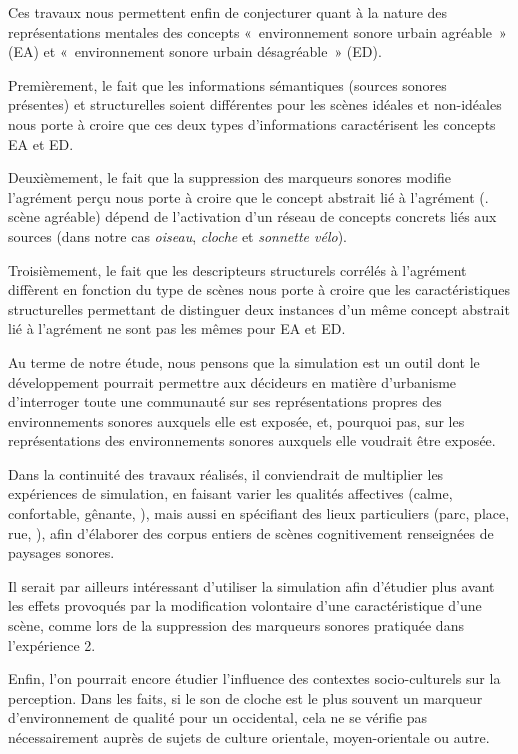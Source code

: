 \documentclass[twoside,twocolumn]{article}
\begin{document}
Ces travaux nous permettent enfin de conjecturer quant à la nature des représentations mentales des concepts «~environnement sonore urbain agréable~» (EA) et «~environnement sonore urbain désagréable~» (ED).

Premièrement, le fait que les informations sémantiques (sources sonores présentes) et structurelles soient différentes pour les scènes idéales et non-idéales nous porte à croire que ces deux types d'informations caractérisent les concepts EA et ED.

Deuxièmement, le fait que la suppression des marqueurs sonores modifie l'agrément perçu nous porte à croire que le concept abstrait lié à l'agrément (\eg. scène agréable) dépend de l'activation d'un réseau de concepts concrets liés aux sources (dans notre cas \emph{oiseau}, \emph{cloche} et \emph{sonnette vélo}).

Troisièmement, le fait que les descripteurs structurels corrélés à l'agrément diffèrent en fonction du type de scènes nous porte à croire que les caractéristiques structurelles permettant de distinguer deux instances d'un même concept abstrait lié à l'agrément ne sont pas les mêmes pour EA et ED.

Au terme de notre étude, nous pensons que la simulation est un outil dont le développement pourrait permettre aux décideurs en matière d'urbanisme d'interroger toute une communauté sur ses représentations propres des environnements sonores auxquels elle est exposée, et, pourquoi pas, sur les représentations des environnements sonores auxquels elle voudrait être exposée.

Dans la continuité des travaux réalisés, il conviendrait de multiplier les expériences de simulation, en faisant varier les qualités affectives (calme, confortable, gênante, \etc), mais aussi en spécifiant des lieux particuliers (parc, place, rue, \etc), afin d'élaborer des corpus entiers de scènes cognitivement renseignées de paysages sonores.

Il serait par ailleurs intéressant d'utiliser la simulation afin d'étudier plus avant les effets provoqués par la modification volontaire d'une caractéristique d'une scène, comme lors de la suppression des marqueurs sonores pratiquée dans l'expérience 2.

Enfin, l'on pourrait encore étudier l'influence des contextes socio-culturels sur la perception. Dans les faits, si le son de cloche est le plus souvent un marqueur d'environnement de qualité pour un occidental, cela ne se vérifie pas nécessairement auprès de sujets de culture orientale, moyen-orientale ou autre.
\end{document}
